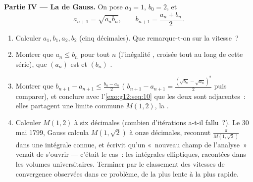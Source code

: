 \begin{problem}
\medskip
\noindent\textbf{Partie IV --- La   de
Gauss.}
On pose $a_0 = 1$, $b_0 = 2$, et
\[
a_{n+1} = \sqrt{a_n b_n},
\qquad
b_{n+1} = \frac{a_n + b_n}{2} .
\]
\begin{enumerate}[resume]
  \item Calculer $a_1, b_1, a_2, b_2$ (cinq décimales). Que
        remarque-t-on sur la vitesse~?
  \item Montrer que $a_n \leq b_n$ pour tout $n$ (l'inégalité
        , croisée tout au long de cette
        série), que $(a_n)$ est  et $(b_n)$ .
  \item Montrer que
        $b_{n+1} - a_{n+1} \leq \frac{b_n - a_n}{2}$ (
        $b_{n+1} - a_{n+1} =
        \frac{(\sqrt{b_n} - \sqrt{a_n})^2}{2}$ puis comparer), et
        conclure avec l'\cref{exo:g12:seq:10} que les deux 
        sont adjacentes~: elles partagent une limite commune
        $M(1, 2)$, la \emph{ }.
  \item Calculer $M(1, 2)$ à six décimales (combien d'itérations
        a-t-il fallu~?). Le 30 mai 1799, Gauss calcula
        $M(1, \sqrt2)$ à onze décimales, reconnut
        $\frac{\pi}{M(1,\sqrt2)}$ dans une intégrale connue, et
        écrivit qu'un «~nouveau champ de l'analyse~» venait de
        s'ouvrir --- c'était le cas~: les intégrales elliptiques,
        racontées dans les volumes universitaires. Terminer par le
        classement des vitesses de convergence observées dans ce
        problème, de la plus lente à la plus rapide.
\end{enumerate}
\end{problem}
